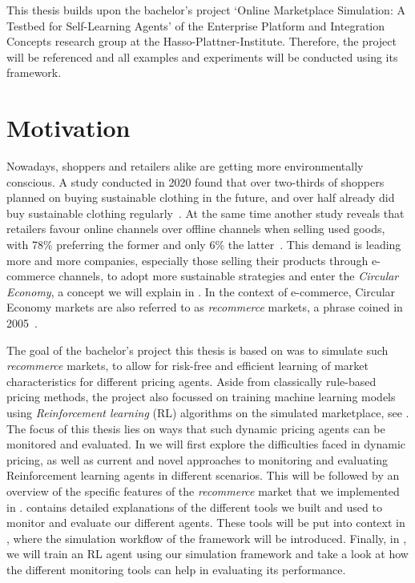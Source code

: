 \begin{jointwork}
	This thesis builds upon the bachelor's project `Online Marketplace Simulation: A Testbed for Self-Learning Agents' of the Enterprise Platform and Integration Concepts research group at the Hasso-Plattner-Institute. Therefore, the project will be referenced and all examples and experiments will be conducted using its framework.
\end{jointwork}

\section{Motivation}

Nowadays, shoppers and retailers alike are getting more environmentally conscious. A study conducted in 2020 found that over two-thirds of shoppers planned on buying sustainable clothing in the future, and over half already did buy sustainable clothing regularly~\cite{StatistaSustainableClothing}. At the same time another study reveals that retailers favour online channels over offline channels when selling used goods, with 78\% preferring the former and only 6\% the latter~\cite{StatistaUsedRetailers}. This demand is leading more and more companies, especially those selling their products through e-commerce channels, to adopt more sustainable strategies and enter the \emph{Circular Economy}, a concept we will explain in . In the context of e-commerce, Circular Economy markets are also referred to as \emph{recommerce} markets, a phrase coined in 2005~\cite{RecommerceDefinition}.

The goal of the bachelor's project this thesis is based on was to simulate such \emph{recommerce} markets, to allow for risk-free and efficient learning of market characteristics for different pricing agents. Aside from classically rule-based pricing methods, the project also focussed on training machine learning models using \emph{Reinforcement learning} (RL) algorithms on the simulated marketplace, see . The focus of this thesis lies on ways that such dynamic pricing agents can be monitored and evaluated. In  we will first explore the difficulties faced in dynamic pricing, as well as current and novel approaches to monitoring and evaluating Reinforcement learning agents in different scenarios. This will be followed by an overview of the specific features of the \emph{recommerce} market that we implemented in .  contains detailed explanations of the different tools we built and used to monitor and evaluate our different agents. These tools will be put into context in , where the simulation workflow of the framework will be introduced. Finally, in , we will train an RL agent using our simulation framework and take a look at how the different monitoring tools can help in evaluating its performance.

